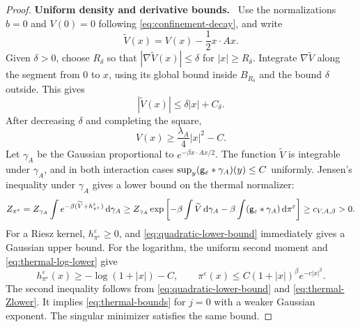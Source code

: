 \documentclass[11pt,reqno]{amsart}
\numberwithin{equation}{section}
\theoremstyle{plain}
\theoremstyle{remark}
\newcommand{\parheading}[1]{\par\medskip\noindent\textbf{#1}\ }
\begin{document}
\begin{proof}
\parheading{Uniform density and derivative bounds.}
Use the normalizations $b=0$ and $V(0)=0$ following \eqref{eq:confinement-decay}, and write
\begin{equation}\label{eq:sublinear-remainder}
 \widetilde V(x)=V(x)-\frac12x\cdot Ax.
\end{equation}
Given $\delta>0$, choose $R_\delta$ so that $|\nabla\widetilde V(x)|\le\delta$ for $|x|\ge R_\delta$. Integrate $\nabla\widetilde V$ along the segment from $0$ to $x$, using its global bound inside $B_{R_\delta}$ and the bound $\delta$ outside. This gives
\begin{equation}\label{eq:sublinear-growth}
 |\widetilde V(x)|\le\delta|x|+C_\delta.
\end{equation}
After decreasing $\delta$ and completing the square,
\begin{equation}\label{eq:quadratic-lower-bound}
 V(x)\ge\frac{\lambda_A}{4}|x|^2-C.
\end{equation}
Let $\gamma_A$ be the Gaussian proportional to $e^{-\beta x\cdot Ax/2}$. The function $\widetilde V$ is integrable under $\gamma_A$, and in both interaction cases $\sup_y(\mathsf g_\varepsilon*\gamma_A)(y)\le C$ uniformly. Jensen's inequality under $\gamma_A$ gives a lower bound on the thermal normalizer:
\begin{equation}
 Z_{\pi^\varepsilon} =Z_{\gamma_A}\int e^{-\beta(\widetilde V+h_{\pi^\varepsilon}^\varepsilon)}\,\mathrm d\gamma_A \ge Z_{\gamma_A} \exp\left[-\beta\int\widetilde V\,\mathrm d\gamma_A -\beta\int(\mathsf g_\varepsilon*\gamma_A)\,\mathrm d\pi^\varepsilon\right] \ge c_{V,A,\beta}>0. \label{eq:thermal-Zlower}
\end{equation}
For a Riesz kernel, $h_{\pi^\varepsilon}^\varepsilon\ge0$, and \eqref{eq:quadratic-lower-bound} immediately gives a Gaussian upper bound. For the logarithm, the uniform second moment and \eqref{eq:thermal-log-lower} give
\begin{equation}\label{eq:thermal-log-density}
 h_{\pi^\varepsilon}^\varepsilon(x)\ge-\log(1+|x|)-C,
 \qquad
 \pi^\varepsilon(x)\le C(1+|x|)^\beta e^{-c|x|^2}.
\end{equation}
The second inequality follows from \eqref{eq:quadratic-lower-bound} and \eqref{eq:thermal-Zlower}. It implies \eqref{eq:thermal-bounds} for $j=0$ with a weaker Gaussian exponent. The singular minimizer satisfies the same bound.


\end{proof}
\end{document}
